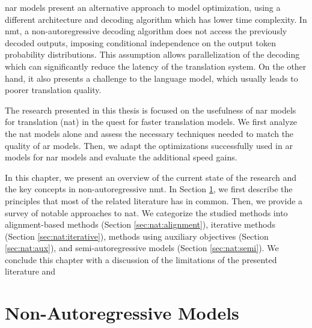 
\Ac{nar} models present an alternative approach to model optimization, using a
different architecture and decoding algorithm which has lower time complexity.
In \ac{nmt}, a non-autoregressive decoding algorithm does not access the
previously decoded outputs, imposing conditional independence on the output
token probability distributions. This assumption allows parallelization of the
decoding which can significantly reduce the latency of the translation
system. On the other hand, it also presents a challenge to the language model,
which usually leads to poorer translation quality.

The research presented in this thesis is focused on the usefulness of \ac{nar}
models for translation (\acs{nat}) in the quest for faster
translation models. We first analyze the \ac{nat} models alone and assess the
necessary techniques needed to match the quality of \ac{ar} models.  Then, we
adapt the optimizations successfully used in \ac{ar} models for \ac{nar} models
and evaluate the additional speed gains.

In this chapter, we present an overview of the current state of the research
and the key concepts in non-autoregressive \ac{nmt}.  In Section
\ref{sec:nat:principles}, we first describe the principles that most of the
related literature has in common. Then, we provide a survey of notable
approaches to \ac{nat}. We categorize the studied methods into alignment-based
methods (Section \ref{sec:nat:alignment}), iterative methods (Section
\ref{sec:nat:iterative}), methods using auxiliary objectives (Section
\ref{sec:nat:aux}), and semi-autoregressive models (Section
\ref{sec:nat:semi}).  We conclude this chapter with a discussion of the
limitations of the presented literature and 


\section{Non-Autoregressive Models}%
\label{sec:nat:principles}


